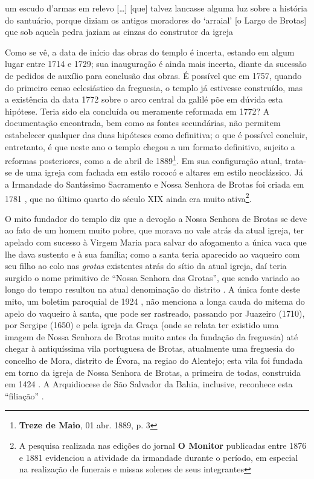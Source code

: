 \begin{citacao}
um escudo d'armas em relevo [\dots] [que] talvez lancasse alguma luz sobre a história do santuário, porque diziam os antigos moradores do `arraial' [o Largo de Brotas] que sob aquela pedra jaziam as cinzas do construtor da igreja \cite[p.~88]{campos_brotas_1942}
\end{citacao}

Como se vê, a data de início das obras do templo é incerta, estando em algum lugar entre 1714 e 1729; sua inauguração é ainda mais incerta, diante da sucessão de pedidos de auxílio para conclusão das obras. É possível que em 1757, quando do primeiro censo eclesiástico da freguesia, o templo já estivesse construído, mas a existência da data 1772 sobre o arco central da galilé põe em dúvida esta hipótese. Teria sido ela concluída ou meramente reformada em 1772? A documentação encontrada, bem como as fontes secundárias, não permitem estabelecer qualquer das duas hipóteses como definitiva; o que é possível concluir, entretanto, é que neste ano o templo chegou a um formato definitivo, sujeito a reformas posteriores, como a de abril de 1889\footnote{\textbf{Treze de Maio}, 01 abr. 1889, p. 3}. Em sua configuração atual, trata-se de uma igreja com fachada em estilo rococó e altares em estilo neoclássico. Já a Irmandade do Santíssimo Sacramento e Nossa Senhora de Brotas foi criada em 1781 \cite[p.~172]{VASCONCELOS2002}, que no último quarto do século XIX ainda era muito ativa\footnote{A pesquisa realizada nas edições do jornal \textbf{O Monitor} publicadas entre 1876 e 1881 evidenciou a atividade da irmandade durante o período, em especial na realização de funerais e missas solenes de seus integrantes}.

O mito fundador do templo diz que a devoção a Nossa Senhora de Brotas se deve ao fato de um homem muito pobre, que morava no vale atrás da atual igreja, ter apelado com sucesso à Virgem Maria para salvar do afogamento a única vaca que lhe dava sustento e à sua família; como a santa teria aparecido ao vaqueiro com seu filho ao colo nas \textit{grotas} existentes atrás do sítio da atual igreja, daí teria surgido o nome primitivo de ``Nossa Senhora das Grotas'', que sendo variado ao longo do tempo resultou na atual denominação do distrito \cite{campos_brotas_1942,texbar_capellas_1930}. A única fonte deste mito, um boletim paroquial de 1924 \cite[p.~345]{texbar_capellas_1930}, não menciona a longa cauda do mitema do apelo do vaqueiro à santa, que pode ser rastreado, passando por Juazeiro (1710), por Sergipe (1650) e pela igreja da Graça (onde se relata ter existido uma imagem de Nossa Senhora de Brotas muito antes da fundação da freguesia) \cite[p.~89-92]{campos_brotas_1942} até chegar à antiquíssima vila portuguesa de Brotas, atualmente uma freguesia do concelho de Mora, distrito de Évora, na regiao do Alentejo; esta vila foi fundada em torno da igreja de Nossa Senhora de Brotas, a primeira de todas, construida em 1424 \cite{campos_brotas_1942, correia_brotas_2010, portugal_brotas_2015}. A Arquidiocese de São Salvador da Bahia, inclusive, reconhece esta ``filiação'' \cite{arqui_brotas_2015}.

